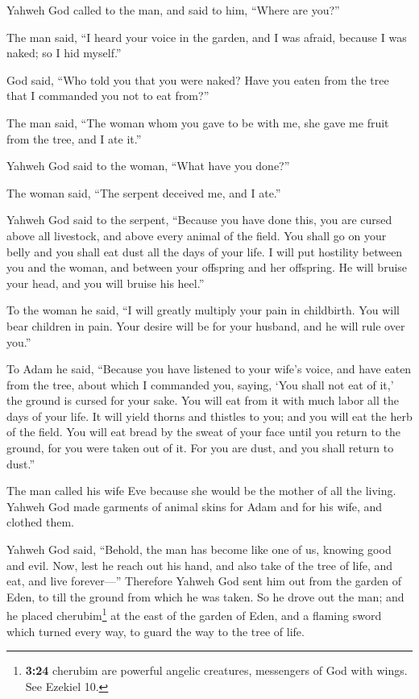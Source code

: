  Yahweh God called to the man, and said to him, ``Where
are you?''

 The man said, ``I heard your voice in the garden, and I
was afraid, because I was naked; so I hid myself.''

 God said, ``Who told you that you were naked? Have you
eaten from the tree that I commanded you not to eat from?''

 The man said, ``The woman whom you gave to be with me,
she gave me fruit from the tree, and I ate it.''

 Yahweh God said to the woman, ``What have you done?''

The woman said, ``The serpent deceived me, and I ate.''

 Yahweh God said to the serpent, ``Because you have done
this, you are cursed above all livestock, and above every animal of the
field. You shall go on your belly and you shall eat dust all the days of
your life.  I will put hostility between you and the
woman, and between your offspring and her offspring. He will bruise your
head, and you will bruise his heel.''

 To the woman he said, ``I will greatly multiply your
pain in childbirth. You will bear children in pain. Your desire will be
for your husband, and he will rule over you.''

 To Adam he said, ``Because you have listened to your
wife's voice, and have eaten from the tree, about which I commanded you,
saying, `You shall not eat of it,' the ground is cursed for your sake.
You will eat from it with much labor all the days of your life.
 It will yield thorns and thistles to you; and you will
eat the herb of the field.  You will eat bread by the
sweat of your face until you return to the ground, for you were taken
out of it. For you are dust, and you shall return to dust.''

 The man called his wife Eve because she would be the
mother of all the living.  Yahweh God made garments of
animal skins for Adam and for his wife, and clothed them.

 Yahweh God said, ``Behold, the man has become like one
of us, knowing good and evil. Now, lest he reach out his hand, and also
take of the tree of life, and eat, and live forever---'' 
Therefore Yahweh God sent him out from the garden of Eden, to till the
ground from which he was taken.  So he drove out the man;
and he placed cherubim\footnote{\textbf{3:24} cherubim are powerful
  angelic creatures, messengers of God with wings. See Ezekiel 10.} at
the east of the garden of Eden, and a flaming sword which turned every
way, to guard the way to the tree of life.

